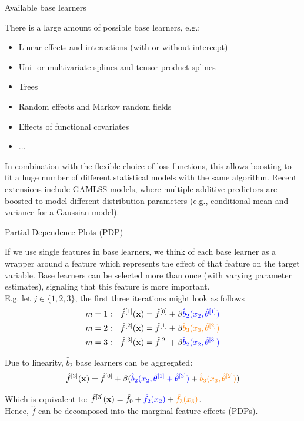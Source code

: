 \begin{vbframe}{Available base learners}

There is a large amount of possible base learners, e.g.:

\begin{itemize}
  \item Linear effects and interactions (with or without intercept)
  \item Uni- or multivariate splines and tensor product splines
  \item Trees
  \item Random effects and Markov random fields
  \item Effects of functional covariates
  \item ...
\end{itemize}

\lz

In combination with the flexible choice of loss functions, this allows boosting to fit  a huge number of different statistical models with the same algorithm. Recent extensions include GAMLSS-models, where multiple additive predictors are boosted to model different distribution parameters (e.g., conditional mean and variance for a Gaussian model).

\end{vbframe}
\begin{vbframe}{Partial Dependence Plots (PDP)}

If we use single features in base learners, we think of each base learner as a wrapper around a feature which represents the effect of that feature on the target variable. Base learners can be selected more than once (with varying parameter estimates), signaling that this feature is more important.\\
E.g. let $j \in \{ 1,2,3 \}$, the first three iterations might look as follows
\begin{align*}
m = 1: \quad & \hat{f}^{[1]}(\mathbf{x}) = \hat{f}^{[0]} + \beta \textcolor{blue}{\hat{b}_2(x_2, \hat{\theta}^{[1]})}\\
m = 2: \quad & \hat{f}^{[2]}(\mathbf{x}) = \hat{f}^{[1]} + \beta  \textcolor{orange}{\hat{b}_3(x_3, \hat{\theta}^{[2]})}\\
m = 3: \quad & \hat{f}^{[3]}(\mathbf{x}) = \hat{f}^{[2]} + \beta \textcolor{blue}{\hat{b}_2(x_2, \hat{\theta}^{[3]})}
\end{align*}

Due to linearity, $\hat{b}_2$ base learners can be aggregated:
$$
\hat{f}^{[3]}(\mathbf{x}) = \hat{f}^{[0]} + \beta (\textcolor{blue}{\hat{b}_2(x_2, \hat{\theta}^{[1]} + \hat{\theta}^{[3]})} + \textcolor{orange}{\hat{b}_3(x_3, \hat{\theta}^{[2]})})
$$

Which is equivalent to:
$\hat{f}^{[3]}(\mathbf{x}) = \hat{f}_0 + \textcolor{blue}{\hat{f}_2(x_2)} + \textcolor{orange}{\hat{f}_3(x_3)}$.\\
Hence, $\hat{f}$ can be decomposed into the marginal feature effects (PDPs).



\end{vbframe}




